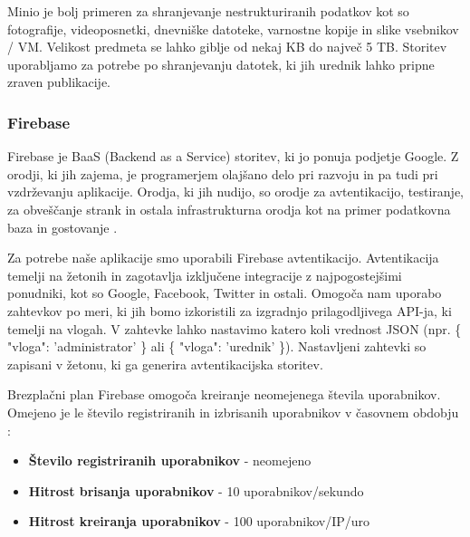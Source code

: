 \documentclass[a4paper, 12pt]{book}
\begin{document}
Minio je bolj primeren za shranjevanje nestrukturiranih podatkov kot so fotografije, videoposnetki, dnevniške datoteke, varnostne kopije in slike vsebnikov / VM. Velikost predmeta se lahko giblje od nekaj KB do največ 5 TB. Storitev uporabljamo za potrebe po shranjevanju datotek, ki jih urednik lahko pripne zraven publikacije.



\subsubsection{Firebase}
Firebase je BaaS (Backend as a Service) storitev, ki jo ponuja podjetje Google. Z orodji, ki jih zajema, je programerjem olajšano delo pri razvoju in pa tudi pri vzdrževanju aplikacije. Orodja, ki jih nudijo, so orodje za avtentikacijo, testiranje, za obveščanje strank in ostala infrastrukturna orodja kot na primer podatkovna baza in gostovanje \cite{firebase-about}.

Za potrebe naše aplikacije smo uporabili Firebase avtentikacijo. Avtentikacija temelji na žetonih in zagotavlja izključene integracije z najpogostejšimi ponudniki, kot so Google, Facebook, Twitter in ostali. Omogoča nam uporabo zahtevkov po meri, ki jih bomo izkoristili za izgradnjo prilagodljivega API-ja, ki temelji na vlogah. V zahtevke lahko nastavimo katero koli vrednost JSON (npr. \{ "vloga": 'administrator' \} ali \{ "vloga": 'urednik' \}). Nastavljeni zahtevki so zapisani v žetonu, ki ga generira avtentikacijska storitev.

Brezplačni plan Firebase omogoča kreiranje neomejenega števila uporabnikov. Omejeno je le število registriranih in izbrisanih uporabnikov v časovnem obdobju \cite{firebase-limits}:


\begin{itemize}
	\item \textbf{Število registriranih uporabnikov} - neomejeno
	\item \textbf{Hitrost brisanja uporabnikov} - 10 uporabnikov/sekundo
	\item \textbf{Hitrost kreiranja uporabnikov} - 100 uporabnikov/IP/uro
\end{itemize}
\end{document}
